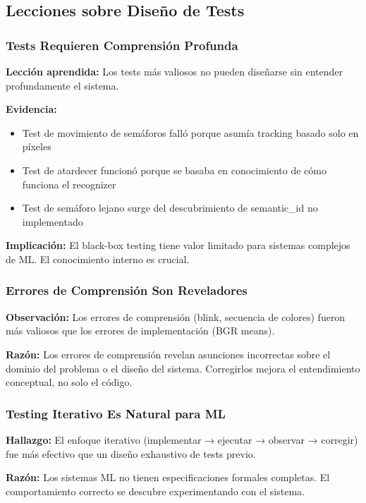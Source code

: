 \subsection{Lecciones sobre Diseño de Tests}

\subsubsection{Tests Requieren Comprensión Profunda}

\textbf{Lección aprendida:} Los tests más valiosos no pueden diseñarse sin entender profundamente el sistema.

\textbf{Evidencia:}
\begin{itemize}
    \item Test de movimiento de semáforos falló porque asumía tracking basado solo en píxeles
    \item Test de atardecer funcionó porque se basaba en conocimiento de cómo funciona el recognizer
    \item Test de semáforo lejano surge del descubrimiento de semantic\_id no implementado
\end{itemize}

\textbf{Implicación:} El black-box testing tiene valor limitado para sistemas complejos de ML. El conocimiento interno es crucial.

\subsubsection{Errores de Comprensión Son Reveladores}

\textbf{Observación:} Los errores de comprensión (blink, secuencia de colores) fueron más valiosos que los errores de implementación (BGR means).

\textbf{Razón:} Los errores de comprensión revelan asunciones incorrectas sobre el dominio del problema o el diseño del sistema. Corregirlos mejora el entendimiento conceptual, no solo el código.

\subsubsection{Testing Iterativo Es Natural para ML}

\textbf{Hallazgo:} El enfoque iterativo (implementar → ejecutar → observar → corregir) fue más efectivo que un diseño exhaustivo de tests previo.

\textbf{Razón:} Los sistemas ML no tienen especificaciones formales completas. El comportamiento correcto se descubre experimentando con el sistema.

